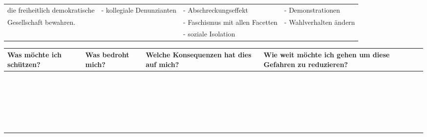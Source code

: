 \documentclass[landscape]{scrartcl}
\begin{document}
\begin{tabular}{p{60mm}p{60mm}p{60mm}p{60mm}}
			die freiheitlich demokratische&	  -	kollegiale Denunzianten	   &	- Abschreckungseffekt 			& - Demonstrationen\\
			Gesellschaft bewahren.			&														  &	- Faschismus mit allen Facetten& - Wahlverhalten ändern\\
																	&															& - soziale Isolation							& \\
		\end{tabular}
		\begin{tabular}{p{60mm}p{60mm}p{60mm}p{60mm}} 
			\toprule
			Was möchte ich schützen? & Was bedroht mich? & Welche Konsequenzen hat dies auf mich?  & Wie weit möchte ich gehen um diese Gefahren zu reduzieren?   \\
			\midrule
			 		&   &  & \\
			 		&   &  & \\
			 	 &   &  & \\
			 	 &   &  & \\
				 &		&		& \\
				 &		&		& \\
				 &		&		& \\
				 &		&		& \\
				 &		&		& \\
				 &		&		& \\
				 &		&		& \\
				 &		&		& \\
				 	&   &  & \\
				 &   &  & \\
				 &   &  & \\
				 &   &  & \\
				 &		&		& \\
				 &		&		& \\
				 &		&		& \\
				 &		&		& \\
				 &		&		& \\
				 &		&		& \\
				 &		&		& \\
				 &		&		& \\
			\bottomrule
		\end{tabular}
\end{document}
